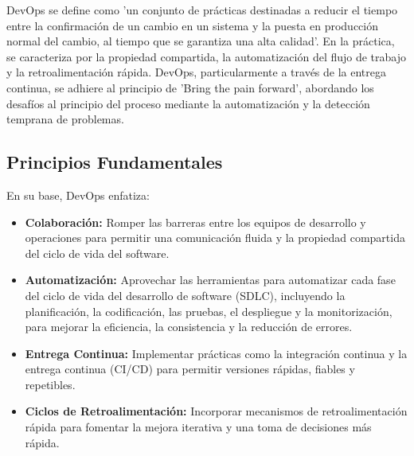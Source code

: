 \documentclass[12pt]{book}
\begin{document}
DevOps se define como 'un conjunto de prácticas destinadas a reducir el tiempo entre la confirmación de un cambio en un sistema y la puesta en producción normal del cambio, al tiempo que se garantiza una alta calidad'. En la práctica, se caracteriza por la propiedad compartida, la automatización del flujo de trabajo y la retroalimentación rápida.
DevOps, particularmente a través de la entrega continua, se adhiere al principio de 'Bring the pain forward', abordando los desafíos al principio del proceso mediante la automatización y la detección temprana de problemas.

\subsection{Principios Fundamentales}

En su base, DevOps enfatiza:
\begin{itemize}
    \item \textbf{Colaboración:} Romper las barreras entre los equipos de desarrollo y operaciones para permitir una comunicación fluida y la propiedad compartida del ciclo de vida del software.
    \item \textbf{Automatización:} Aprovechar las herramientas para automatizar cada fase del ciclo de vida del desarrollo de software (SDLC), incluyendo la planificación, la codificación, las pruebas, el despliegue y la monitorización, para mejorar la eficiencia, la consistencia y la reducción de errores.
    \item \textbf{Entrega Continua:} Implementar prácticas como la integración continua y la entrega continua (CI/CD) para permitir versiones rápidas, fiables y repetibles.
    \item \textbf{Ciclos de Retroalimentación:} Incorporar mecanismos de retroalimentación rápida para fomentar la mejora iterativa y una toma de decisiones más rápida.
\end{itemize}
\end{document}
